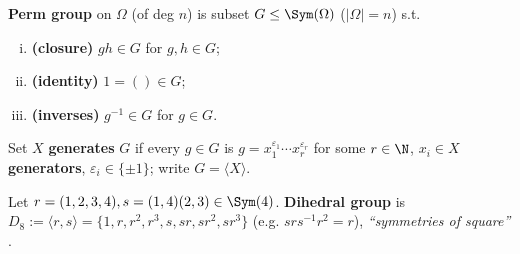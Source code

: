 \begin{slide}
    \begin{definition}
        \vspace{0pt}
        \textbf{Perm group} on $\Omega$ (of deg $n$) is subset $G \leq \Sym(\Omega)$ ($|\Omega| = n$) s.t.
        \begin{enumerate}[(i)]
            \item \textbf{(closure)} $gh \in G$ for $g,h \in G$; \pause
            \item \textbf{(identity)} $1 = () \in G$; \pause
            \item \textbf{(inverses)} $g^{-1} \in G$ for $g \in G$.
        \end{enumerate}
    \end{definition} \pause

    \begin{definition}[generator]
        \vspace{0pt}
        Set $X$ \textbf{generates} $G$ if every $g \in G$ is $g = x_1^{\varepsilon_1} \dotsb x_r^{\varepsilon_r}$ for some $r \in \N$, $x_i \in X$ \textbf{generators}, $\varepsilon_i \in \{\pm 1\}$; write $G = \langle X \rangle$.
    \end{definition} \pause

    \begin{example}
        \vspace{0pt}
        Let $r = (1,2,3,4),s = (1,4)(2,3) \in \Sym(4)$. \textbf{Dihedral group} is $D_8 := \langle r,s \rangle = \{1,r,r^2,r^3,s,sr,sr^2,sr^3\}$ (e.g. $srs^{-1}r^2 = r$), \textit{``symmetries of square''} .
    \end{example}
\end{slide}


